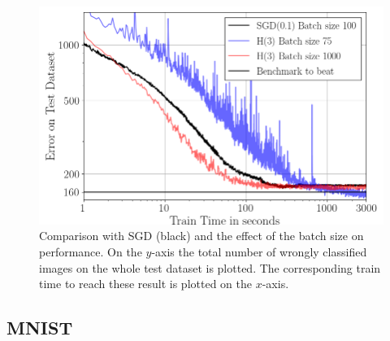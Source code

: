 \documentclass[conference]{IEEEtran}
\begin{document}
	\begin{figure}[htbp]
		\centerline{\includegraphics[scale=0.52]{Plot_Batch_size.png}}
		\caption{Comparison with SGD (black) and the effect of the batch size on performance. On the $y$-axis the total number of wrongly classified images on the whole test dataset is plotted. The corresponding train time to reach these result is plotted on the $x$-axis.}
		\label{fig3}
	\end{figure}
	
	\subsection{MNIST}
	
\end{document}
